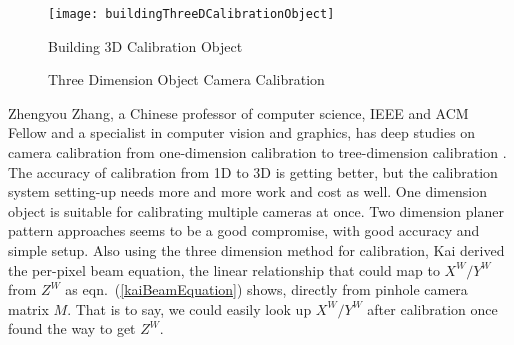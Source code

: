 %
\begin{figure}[!t]
\centering
\texttt{[image: buildingThreeDCalibrationObject]}
\caption{Building 3D Calibration Object \cite{threeDExample_2014}}
\label{buildingThreeDCalibrationObject}
\end{figure}%
%
\begin{figure}[!t]
\centering
{}
\caption{Three Dimension Object Camera Calibration \cite{threeDExample_2014}}
\label{twoPlanesCalibration}
\end{figure}%
%


%





Zhengyou Zhang, a Chinese professor of computer science, IEEE and ACM Fellow and a specialist in computer vision and graphics, has deep studies on camera calibration from one-dimension calibration to tree-dimension calibration \cite{zhangCalibration1_2004, zhangCalibration2_2000, Zhengyou04}. The accuracy of calibration from 1D to 3D is getting better, but the calibration system setting-up needs more and more work and cost as well. One dimension object is suitable for calibrating multiple cameras at once. Two dimension planer pattern approaches seems to be a good compromise, with good accuracy and simple setup. Also using the three dimension method for calibration, Kai \cite{Kai10} derived the per-pixel  beam equation, the linear relationship that could map to \(X^W/Y^W\) from \(Z^W\) as eqn.~(\ref{kaiBeamEquation}) shows, directly from pinhole camera matrix \(M\). That is to say, we could easily look up \(X^W/Y^W\) after calibration once found the way to get \(Z^W\).

